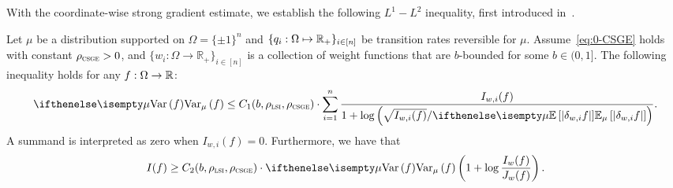 With the coordinate-wise strong gradient estimate, we establish the following $L^1-L^2$ inequality, first introduced in~\cite{CorderoErausquinLedoux12}.
\begin{theorem}\label{lem:l1_l2_talagrand}
     Let $\mu$ be a distribution supported on $\Omega = \{\pm 1\}^n$ and $\{q_i: \Omega \mapsto \mathbb{R}_+\}_{i\in[n]}$ be transition rates reversible for $\mu$.
    Assume~\eqref{eq:0-CSGE} holds with constant $\rho_{{\normalfont\textsc{csge}}} > 0$, and $\{w_i:\Omega \to \mathbb{R}_+\}_{i \in [n]}$ is a collection of weight functions that are $b$-bounded for some $b \in (0,1]$. The following inequality holds for any $f:\Omega \to \mathbb{R}$:
    \begin{align}\label{eq:l1_l2_talagrand_2}
        \Var[\mu]{f} \leq C_1(b,\rho_{\LSI},\rho_{\CSGE}) \cdot \sum_{i=1}^n \frac{I_{w,i} (f)}{1 + \log\tp{\sqrt{I_{w,i}(f)} / \E[\mu]{|\delta_{w,i} f|}}}.
    \end{align}
    A summand is interpreted as zero when $I_{w,i}(f)=0$.
    Furthermore, we have that
    \begin{align}\label{eq:l1_l2_talagrand_3}
        I(f) \geq C_2(b,\rho_{\LSI},\rho_{\CSGE})\cdot \Var[\mu]{f}\tp{1 + \log \frac{I_w(f)}{J_w(f)}} .
    \end{align}
\end{theorem}

